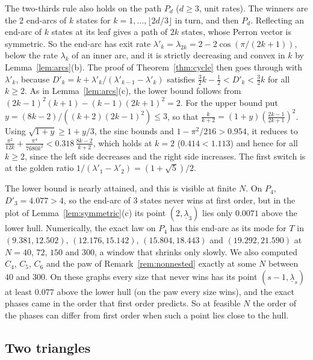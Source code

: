 \begin{remark}[paths]\label{rem:paths}
The two-thirds rule also holds on the path $P_d$ ($d\ge3$, unit rates). The
winners are the 2 end-arcs of $k$ states for $k=1,\dots,\lfloor2d/3\rfloor$ in
turn, and then $P_d$. Reflecting an end-arc of $k$ states at its leaf gives a
path of $2k$ states, whose Perron vector is symmetric. So the end-arc has exit
rate $\lambda'_k=\lambda_{2k}=2-2\cos(\pi/(2k+1))$, below the rate $\lambda_k$
of an inner arc, and it is strictly decreasing and convex in $k$ by
Lemma~\ref{lem:arcs}(b). The proof of Theorem~\ref{thm:cycle} then goes through
with $\lambda'_k$, because
$D'_k=k+\lambda'_k/(\lambda'_{k-1}-\lambda'_k)$ satisfies
$\frac32k-\frac12<D'_k<\frac32k$ for all $k\ge2$. As in
Lemma~\ref{lem:arcs}(c), the lower bound follows from
$(2k-1)^2(k+1)-(k-1)(2k+1)^2=2$. For the upper bound put
$y=(8k-2)/((k+2)(2k-1)^2)\le3$, so that $\frac
k{k+2}=(1+y)(\frac{2k-1}{2k+1})^2$. Using $\sqrt{1+y}\ge1+y/3$, the sinc bounds
and $1-\pi^2/216>0.954$, it reduces to
$\frac{\pi^2}{12k}+\frac{\pi^4}{7680k^2}<0.318\,\frac{8k-2}{k+2}$, which holds at
$k=2$ ($0.414<1.113$) and hence for all $k\ge2$, since the left side decreases
and the right side increases. The first switch is at the
golden ratio $1/(\lambda'_1-\lambda'_2)=(1+\sqrt5)/2$.

The lower bound is nearly attained, and this is visible at finite $N$. On $P_4$,
$D'_3=4.077>4$, so the end-arc of $3$ states never wins at first order, but in
the plot of Lemma~\ref{lem:symmetric}(c) its point $(2,\underline\lambda_3)$
lies only $0.0071$ above the lower hull. Numerically, the exact law on $P_4$
has this end-arc as its mode for $T$ in $(9.381,12.502)$, $(12.176,15.142)$,
$(15.804,18.443)$ and $(19.292,21.590)$ at $N=40$, $72$, $150$ and $300$, a
window that shrinks only slowly. We also computed $C_4$, $C_5$, $C_6$ and the
paw of Remark~\ref{rem:nonnested} exactly at some $N$ between $40$ and $300$.
On these graphs every size that never wins has its point
$(s-1,\underline\lambda_s)$ at least $0.077$ above the lower hull (on the paw
every size wins), and the exact phases came in the order that first order
predicts. So at feasible $N$ the order of the phases can differ from first
order when such a point lies close to the hull.
\end{remark}

\subsection{Two triangles}\label{sec:ex-triangles}

